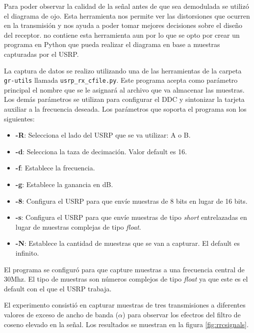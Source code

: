 Para poder observar la calidad de la se\~nal antes de que sea demodulada se utiliz\'o el diagrama de
ojo. Esta herramienta nos permite ver las distorsiones que ocurren en la transmisi\'on y nos ayuda a
poder tomar mejores decisiones sobre el dise\~no del receptor. \gnuradio no contiene esta
herramienta aun por lo que se opto por crear un programa en Python que pueda realizar el diagrama en
base a muestras capturadas por el USRP.

La captura de datos se realizo utilizando una de las herramientas de la carpeta \verb|gr-utils|
llamada \verb|usrp_rx_cfile.py|. Este programa acepta como par\'ametro principal el nombre que se le
asignar\'a al archivo que va almacenar las muestras. Los dem\'as par\'ametros se utilizan para
configurar el DDC y sintonizar la tarjeta auxiliar a la frecuencia deseada. Los par\'ametros que
soporta el programa son los siguientes:

\begin{itemize}
  \item \textbf{-R}: Selecciona el lado del USRP que se va utilizar: A o B.
  \item \textbf{-d}: Selecciona la taza de decimaci\'on. Valor default es 16.
  \item \textbf{-f}: Establece la frecuencia.
  \item \textbf{-g}: Establece la ganancia en dB.
  \item \textbf{-8}: Configura el USRP para que env\'ie muestras de 8 bits en lugar de 16 bits.
  \item \textbf{-s}: Configura el USRP para que env\'ie muestras de tipo \emph{short} entrelazadas
  en lugar de muestras complejas de tipo \emph{float}.
  \item \textbf{-N}: Establece la cantidad de muestras que se van a capturar. El default es
  infinito.
\end{itemize}

El programa se configur\'o para que capture muestras a una frecuencia central de 30Mhz. El tipo de
muestras son n\'umeros complejos de tipo \emph{float} ya que este es el default con el que el USRP
trabaja.

El experimento consisti\'o en capturar muestras de tres transmisiones a diferentes valores de exceso
de ancho de banda ($\alpha$) para observar los efectros del filtro de coseno elevado en la se\~nal.
Los resultados se muestran en la figura \ref{fig:rrcsignals}.

